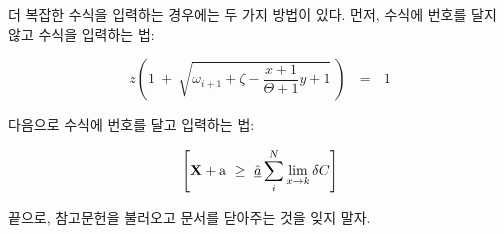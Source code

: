 \documentclass[11pt]{article}           %
\begin{document}
더 복잡한 수식을 입력하는 경우에는 두 가지 방법이 있다.
먼저, 수식에 번호를 달지 않고 수식을 입력하는 법:

\[
    z \left( 1 \ +\  \sqrt{\omega_{i+1} + \zeta -\frac{x+1}{\Theta +1} y + 1} 
    \ \right)
    \ \ \ =\ \ \  1
\]

다음으로 수식에 번호를 달고 입력하는 법:

\begin{equation}
    \left[
    {\bf X} + {\rm a} \ \geq\ 
    \underline{\hat a} \sum_i^N \lim_{x \rightarrow k} \delta C
    \right]
\end{equation}

끝으로, 참고문헌을 불러오고 문서를 닫아주는 것을 잊지 말자.



\end{document}
